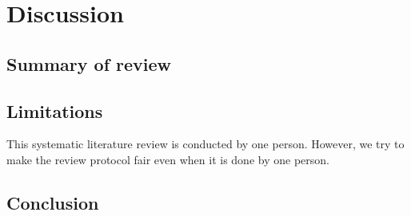 \chapter{Discussion}

\label{Chapter4} %

\section{Summary of review}
\section{Limitations}
This systematic literature review is conducted by one person. However, we try to make the review protocol fair even when it is done by one person. 
\section{Conclusion}